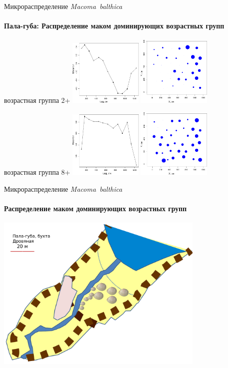 \documentclass{beamer}
\begin{document}
\begin{frame}{Микрораспределение {\it Macoma~balthica}}
\framesubtitle{Пала-губа: Распределение маком доминирующих возрастных групп}
возрастная группа 2+
\includegraphics[width=35mm]{./microdistribution/Pala_macoma_age_N2_.pdf}
\includegraphics[width=35mm]{./microdistribution/Pala_macoma_age_bubb_N2_.pdf}

возрастная группа 8+
\includegraphics[width=35mm]{./microdistribution/Pala_macoma_age_N8_.pdf}
\includegraphics[width=35mm]{./microdistribution/Pala_macoma_age_bubb_N8_.pdf}

\end{frame}

\begin{frame}{Микрораспределение {\it Macoma~balthica}}
\framesubtitle{Распределение маком доминирующих возрастных групп}
\includegraphics[width=100mm]{./Pala_distribution.pdf}
\end{frame}
\end{document}
